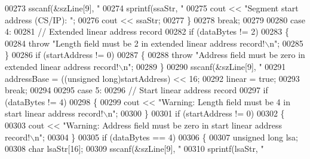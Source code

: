 \begin{DoxyCode}
{{{{00273                         sscanf(&szLine[9], \textcolor{stringliteral}{"%
00274                         sprintf(ssaStr, \textcolor{stringliteral}{"%
00275                         cout << \textcolor{stringliteral}{"Segment start address (CS/IP): "};
00276                         cout << ssaStr;
00277                     \}
00278                     \textcolor{keywordflow}{break};
00279 
00280                 \textcolor{keywordflow}{case} 4:
00281                     \textcolor{comment}{// Extended linear address record}
00282                     \textcolor{keywordflow}{if} (dataBytes != 2)
00283                     \{
00284                         \textcolor{keywordflow}{throw} \textcolor{stringliteral}{"Length field must be 2 in extended linear address record!\(\backslash\)n"};
00285                     \}
00286                     \textcolor{keywordflow}{if} (startAddress != 0)
00287                     \{
00288                         \textcolor{keywordflow}{throw} \textcolor{stringliteral}{"Address field must be zero in extended linear address record!\(\backslash\)n"};
00289                     \}
00290                     sscanf(&szLine[9], \textcolor{stringliteral}{"%
00291                     addressBase = ((\textcolor{keywordtype}{unsigned} long)startAddress) << 16;
00292                     linear = \textcolor{keyword}{true};
00293                     \textcolor{keywordflow}{break};
00294 
00295                 \textcolor{keywordflow}{case} 5:
00296                     \textcolor{comment}{// Start linear address record}
00297                     \textcolor{keywordflow}{if} (dataBytes != 4)
00298                     \{
00299                         cout << \textcolor{stringliteral}{"Warning: Length field must be 4 in start linear address record!\(\backslash\)n"};
00300                     \}
00301                     \textcolor{keywordflow}{if} (startAddress != 0)
00302                     \{
00303                         cout << \textcolor{stringliteral}{"Warning: Address field must be zero in start linear address record!\(\backslash\)n"};
00304                     \}
00305                     \textcolor{keywordflow}{if} (dataBytes == 4)
00306                     \{
00307                         \textcolor{keywordtype}{unsigned} \textcolor{keywordtype}{long} lsa;
00308                         \textcolor{keywordtype}{char}    lsaStr[16];
00309                         sscanf(&szLine[9], \textcolor{stringliteral}{"%
00310                         sprintf(lsaStr, \textcolor{stringliteral}{"%
}}}}}}}}}
\end{DoxyCode}
